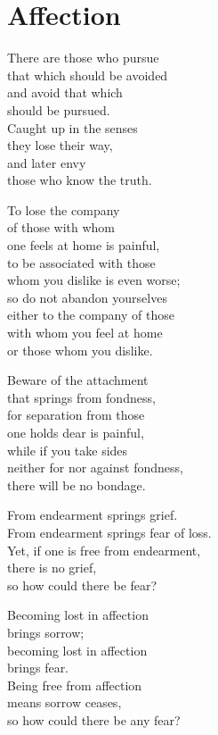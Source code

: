 
\chapter{Affection}


There are those who pursue\\
that which should be avoided\\
and avoid that which\\
should be pursued.\\
Caught up in the senses\\
they lose their way,\\
and later envy\\
those who know the truth.


To lose the company\\
of those with whom\\
one feels at home is painful,\\
to be associated with those\\
whom you dislike is even worse;\\
so do not abandon yourselves\\
either to the company of those\\
with whom you feel at home\\
or those whom you dislike.


Beware of the attachment\\
that springs from fondness,\\
for separation from those\\
one holds dear is painful,\\
while if you take sides\\
neither for nor against fondness,\\
there will be no bondage.


From endearment springs grief.\\
From endearment springs fear of loss.\\
Yet, if one is free from endearment,\\
there is no grief,\\
so how could there be fear?


Becoming lost in affection\\
brings sorrow;\\
becoming lost in affection\\
brings fear.\\
Being free from affection\\
means sorrow ceases,\\
so how could there be any fear?


